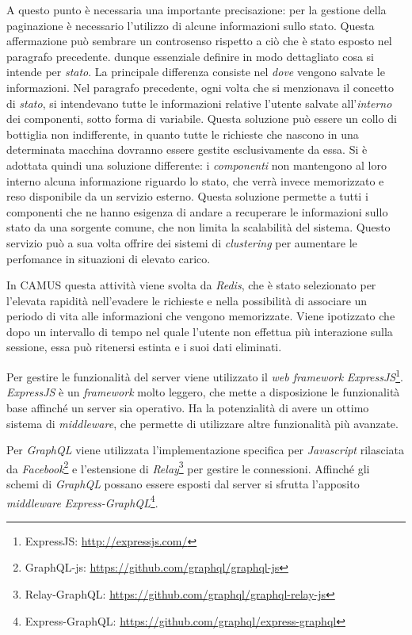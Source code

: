 A questo punto è necessaria una importante precisazione: per la gestione della paginazione è necessario l'utilizzo di alcune informazioni sullo stato. Questa affermazione può sembrare un controsenso rispetto a ciò che è stato esposto nel paragrafo precedente. \upe dunque essenziale definire in modo dettagliato cosa si intende per \emph{stato}. La principale differenza consiste nel \emph{dove} vengono salvate le informazioni. Nel paragrafo precedente, ogni volta che si menzionava il concetto di \emph{stato}, si intendevano tutte le informazioni relative l'utente salvate all'\emph{interno} dei componenti, sotto forma di variabile. Questa soluzione può essere un collo di bottiglia non indifferente, in quanto tutte le richieste che nascono in una determinata macchina dovranno essere gestite esclusivamente da essa. Si è adottata quindi una soluzione differente: i \emph{componenti} non mantengono al loro interno alcuna informazione riguardo lo stato, che verrà invece memorizzato e reso disponibile da un servizio esterno. Questa soluzione permette a tutti i componenti che ne hanno esigenza di andare a recuperare le informazioni sullo stato da una sorgente comune, che non limita la scalabilità del sistema. Questo servizio può a sua volta offrire dei sistemi di \emph{clustering} per aumentare le perfomance in situazioni di elevato carico.

In CAMUS questa attività viene svolta da \emph{Redis}, che è stato selezionato per l'elevata rapidità nell'evadere le richieste e nella possibilità di associare un periodo di vita alle informazioni che vengono memorizzate. Viene ipotizzato che dopo un intervallo di tempo nel quale l'utente non effettua più interazione sulla sessione, essa può ritenersi estinta e i suoi dati eliminati.

Per gestire le funzionalità del server viene utilizzato il \emph{web framework} \emph{ExpressJS}\footnote{ExpressJS: \url{http://expressjs.com/}}. \emph{ExpressJS} è un \emph{framework} molto leggero, che mette a disposizione le funzionalità base affinché un server sia operativo. Ha la potenzialità di avere un ottimo sistema di \emph{middleware}, che permette di utilizzare altre funzionalità più avanzate.

Per \emph{GraphQL} viene utilizzata l'implementazione specifica per \emph{Javascript} rilasciata da \emph{Facebook}\footnote{GraphQL-js: \url{https://github.com/graphql/graphql-js}} e l'estensione di \emph{Relay}\footnote{Relay-GraphQL: \url{https://github.com/graphql/graphql-relay-js}} per gestire le connessioni. Affinché gli schemi di \emph{GraphQL} possano essere esposti dal server si sfrutta l'apposito \emph{middleware} \emph{Express-GraphQL}\footnote{Express-GraphQL: \url{https://github.com/graphql/express-graphql}}.

